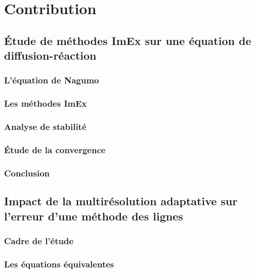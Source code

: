 \documentclass[11pt]{report}
\theoremstyle{definition}
\theoremstyle{remark}
\begin{document}
\newpage
\chapter{Contribution}
    
    \newpage
    \section{Étude de méthodes ImEx sur une équation de diffusion-réaction}
        
        \newpage
        \subsection{L'équation de Nagumo}
        \newpage
        \subsection{Les méthodes ImEx}
        \newpage
        \subsection{Analyse de stabilité}
        \subsection{Étude de la convergence}
        \subsection{Conclusion}
    
    \newpage
    \section{Impact de la multirésolution adaptative sur l'erreur d'une méthode des lignes}
        
        \subsection{Cadre de l'étude}                   
        \subsection{Les équations équivalentes}  
\end{document}
